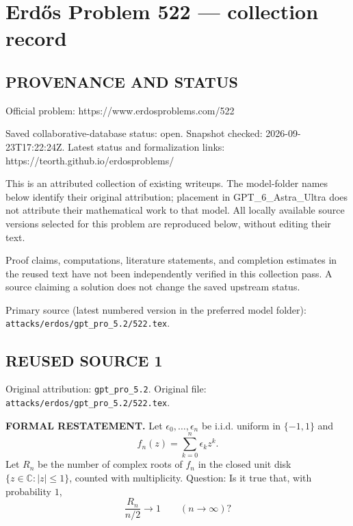 \section*{Erd\H{o}s Problem 522 --- collection record}

\subsection*{PROVENANCE AND STATUS}
Official problem: https://www.erdosproblems.com/522

Saved collaborative-database status: open.
Snapshot checked: 2026-09-23T17:22:24Z.
Latest status and formalization links: https://teorth.github.io/erdosproblems/

This is an attributed collection of existing writeups. The model-folder names below identify their original attribution; placement in GPT\_6\_Astra\_Ultra does not attribute their mathematical work to that model. All locally available source versions selected for this problem are reproduced below, without editing their text.

Proof claims, computations, literature statements, and completion estimates in the reused text have not been independently verified in this collection pass. A source claiming a solution does not change the saved upstream status.

Primary source (latest numbered version in the preferred model folder): \texttt{attacks/erdos/gpt\_pro\_5.2/522.tex}.

\subsection*{REUSED SOURCE 1}
Original attribution: \texttt{gpt\_pro\_5.2}.
Original file: \texttt{attacks/erdos/gpt\_pro\_5.2/522.tex}.


\noindent\textbf{FORMAL RESTATEMENT.}
Let $\epsilon_0,\dots,\epsilon_n$ be i.i.d. uniform in $\{-1,1\}$ and
\[f_n(z)=\sum_{k=0}^n \epsilon_k z^k.
\]
Let $R_n$ be the number of complex roots of $f_n$ in the closed unit disk $\{z\in\mathbb C:|z|\le 1\}$, counted with multiplicity.
Question: Is it true that, with probability $1$,
\[\frac{R_n}{n/2}\to 1\qquad (n\to\infty)?
\]

